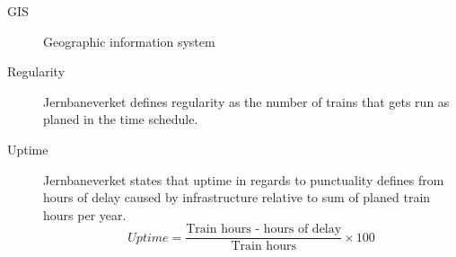 \label{sec:abbriv}
\vspace{5mm}

\begin{description}
\item [GIS] Geographic information system
\item [Regularity]	Jernbaneverket defines regularity as the number of trains that gets run as planed in the time schedule. 
\item [Uptime]	Jernbaneverket states that uptime in regards to punctuality defines from hours of delay caused by infrastructure relative to sum of planed train hours per year. \begin{equation} Uptime =
\frac{\text{Train hours - hours of delay}}{\text{Train hours}}\times 100 \end{equation}
\end{description}


